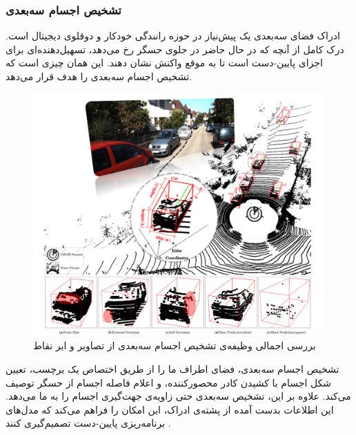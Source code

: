 \subsubsection{تشخیص اجسام سه‌بعدی}
ادراک فضای سه‌بعدی یک پیش‌نیاز در حوزه رانندگی خودکار و دوقلوی دیجیتال است. درک کامل از آنچه که در حال حاضر در جلوی حسگر رخ می‌دهد، تسهیل‌دهنده‌ای برای اجزای پایین-دست است تا به موقع واکنش نشان دهند. این همان چیزی است که تشخیص اجسام سه‌بعدی را هدف قرار می‌دهد.
\begin{figure}[h]
    \centering
    \includegraphics[width=1\linewidth]{figures/3D_Object_Detection_Overview.png}
    \caption{بررسی اجمالی وظیفه‌ی تشخیص اجسام سه‌بعدی از تصاویر و ابر نقاط\cite{qian20223d}}
    \label{fig:3d_object_detection_overview}
\end{figure}تشخیص اجسام سه‌بعدی، فضای اطراف ما را از طریق اختصاص یک برچسب، تعیین شکل اجسام با کشیدن کادر محصورکننده، و اعلام فاصله اجسام از حسگر توصیف می‌کند. علاوه بر این، تشخیص سه‌بعدی حتی زاویه‌ی جهت‌گیری اجسام را به ما می‌دهد. این اطلاعات بدست‌ آمده از پشته‌ی ادراک، این امکان را فراهم می‌کند که مدل‌های برنامه‌ریزی پایین-دست تصمیم‌گیری کنند \cite{qian20223d}.

